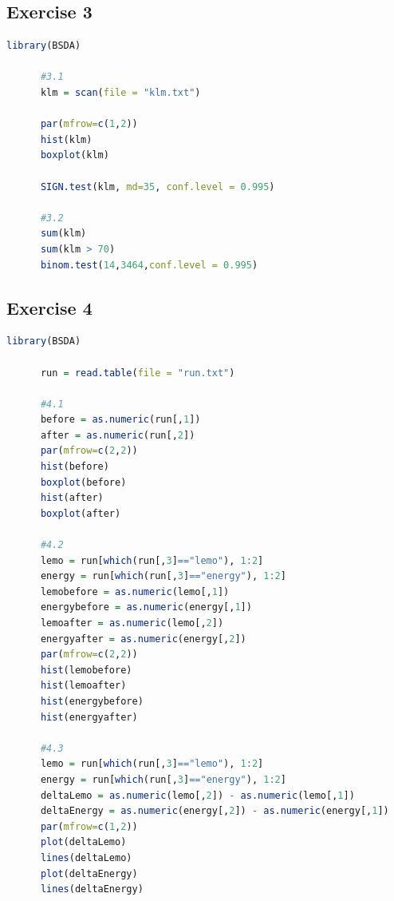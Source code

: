 \documentclass{article}
\begin{document}
    \subsection{Exercise 3}\label{sec:RE3}
      \begin{lstlisting}[language=R]
      library(BSDA)

      #3.1
      klm = scan(file = "klm.txt")

      par(mfrow=c(1,2))
      hist(klm)
      boxplot(klm)

      SIGN.test(klm, md=35, conf.level = 0.995)

      #3.2
      sum(klm)
      sum(klm > 70)
      binom.test(14,3464,conf.level = 0.995)

      \end{lstlisting}
    \subsection{Exercise 4}\label{sec:RE4}
      \begin{lstlisting}[language=R]
      library(BSDA)

      run = read.table(file = "run.txt")

      #4.1
      before = as.numeric(run[,1])
      after = as.numeric(run[,2])
      par(mfrow=c(2,2))
      hist(before)
      boxplot(before)
      hist(after)
      boxplot(after)

      #4.2
      lemo = run[which(run[,3]=="lemo"), 1:2]
      energy = run[which(run[,3]=="energy"), 1:2]
      lemobefore = as.numeric(lemo[,1])
      energybefore = as.numeric(energy[,1])
      lemoafter = as.numeric(lemo[,2])
      energyafter = as.numeric(energy[,2])
      par(mfrow=c(2,2))
      hist(lemobefore)
      hist(lemoafter)
      hist(energybefore)
      hist(energyafter)

      #4.3
      lemo = run[which(run[,3]=="lemo"), 1:2]
      energy = run[which(run[,3]=="energy"), 1:2]
      deltaLemo = as.numeric(lemo[,2]) - as.numeric(lemo[,1])
      deltaEnergy = as.numeric(energy[,2]) - as.numeric(energy[,1])
      par(mfrow=c(1,2))
      plot(deltaLemo)
      lines(deltaLemo)
      plot(deltaEnergy)
      lines(deltaEnergy)

      \end{lstlisting}
\end{document}
